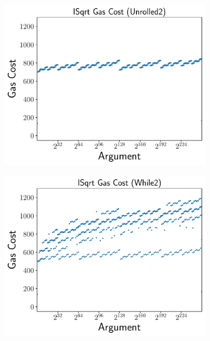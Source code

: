 \begin{figure}[p]
    \begin{subfigure}[t]{0.45\textwidth}
    \includegraphics[width=\textwidth]{plots/plot_Unrolled2.pdf}
    \end{subfigure}
    \begin{subfigure}[t]{0.45\textwidth}
    \includegraphics[width=\textwidth]{plots/plot_While2.pdf}
    \end{subfigure}


\end{figure}
